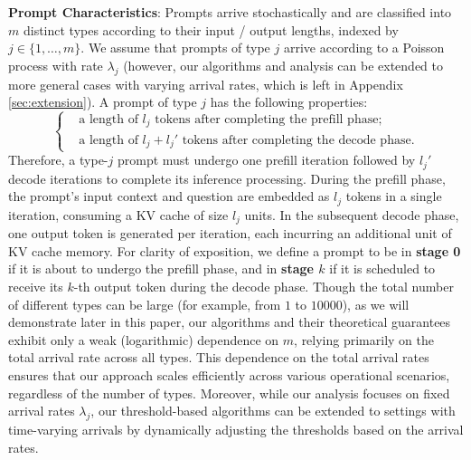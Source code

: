 
\textbf{Prompt Characteristics}: Prompts arrive stochastically and are classified into \( m \) distinct types according to their input / output lengths, indexed by \( j \in \{1, \dots, m\} \). We assume that prompts of type \( j \) arrive according to a Poisson process with rate \( \lambda_j \) (however, our algorithms and analysis can be extended to more general cases with varying arrival rates, which is left in Appendix \ref{sec:extension}). A prompt of type \( j \) has the following properties:
\begin{equation*}
    \left\{\begin{aligned}
        &\text{a length of } l_j \text{ tokens after completing the prefill phase;} \\
&\text{a length of } l_j + l_j' \text{ tokens after completing the decode phase.}
    \end{aligned}\right.
\end{equation*}
Therefore, a type-$j$ prompt must undergo one prefill iteration followed by $l_j'$ decode iterations to complete its inference processing. During the prefill phase, the prompt’s input context and question are embedded as $l_j$ tokens in a single iteration, consuming a KV cache of size $l_j$ units. In the subsequent decode phase, one output token is generated per iteration, each incurring an additional unit of KV cache memory. For clarity of exposition, we define a prompt to be in \textbf{stage 0} if it is about to undergo the prefill phase, and in \textbf{stage $k$} if it is scheduled to receive its $k$-th output token during the decode phase. Though the total number of different types can be large (for example, from $1$ to $10000$), as we will demonstrate later in this paper, our algorithms and their theoretical guarantees exhibit only a weak (logarithmic) dependence on \( m \), relying primarily on the total arrival rate across all types. This dependence on the total arrival rates ensures that our approach scales efficiently across various operational scenarios, regardless of the number of types. Moreover, while our analysis focuses on fixed arrival rates \( \lambda_j \), our threshold-based algorithms can be extended to settings with time-varying arrivals by dynamically adjusting the thresholds based on the arrival rates.


